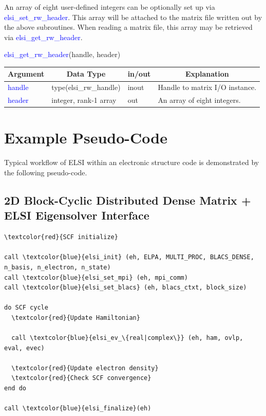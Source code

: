 \documentclass{report}
\begin{document}
An array of eight user-defined integers can be optionally set up via \textcolor{blue}{elsi\_set\_rw\_header}. This array will be attached to the matrix file written out by the above subroutines. When reading a matrix file, this array may be retrieved via \textcolor{blue}{elsi\_get\_rw\_header}.
\begin{labeling}{\hspace{6cm}}
\item [\hspace{0.3cm} \textcolor{blue}{elsi\_get\_rw\_header}(handle, header)]
\end{labeling}

\begin{tabular}[]{|p{20mm}|p{45mm}|p{15mm}|p{85mm}|}
\hline
\multicolumn{1}{|c|}{\textbf{Argument}} & \multicolumn{1}{c|}{\textbf{Data Type}} & \multicolumn{1}{c|}{\textbf{in/out}} & \multicolumn{1}{c|}{\textbf{Explanation}}\\
\hline
\textcolor{blue}{handle} & type(elsi\_rw\_handle) & inout & Handle to matrix I/O instance.\\
\hline
\textcolor{blue}{header} & integer, rank-1 array  & out   & An array of eight integers.\\
\hline
\end{tabular}

\section{Example Pseudo-Code}
\label{sec:example}
Typical workflow of ELSI within an electronic structure code is demonstrated by the following pseudo-code.

\subsection*{2D Block-Cyclic Distributed Dense Matrix + ELSI Eigensolver Interface}
\begin{tcolorbox}
\begin{Verbatim}[commandchars=\\\{\}]
\textcolor{red}{SCF initialize}

call \textcolor{blue}{elsi_init} (eh, ELPA, MULTI_PROC, BLACS_DENSE, n_basis, n_electron, n_state)
call \textcolor{blue}{elsi_set_mpi} (eh, mpi_comm)
call \textcolor{blue}{elsi_set_blacs} (eh, blacs_ctxt, block_size)

do SCF cycle
  \textcolor{red}{Update Hamiltonian}

  call \textcolor{blue}{elsi_ev_\{real|complex\}} (eh, ham, ovlp, eval, evec)

  \textcolor{red}{Update electron density}
  \textcolor{red}{Check SCF convergence}
end do

call \textcolor{blue}{elsi_finalize}(eh)
\end{Verbatim}
\end{tcolorbox}
\end{document}
